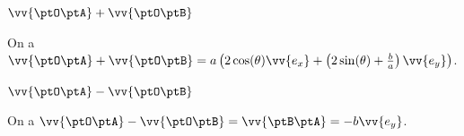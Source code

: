 
\begin{enonce}
 $\vv{\ptO \ptA} + \vv{\ptO \ptB}$
\end{enonce}


\begin{corrige}
	On a $\vv{\ptO \ptA}+ \vv{\ptO \ptB} = a \left(2\cos(\theta) \vv{e_x}+\left(2\sin(\theta)+\frac{b}{a}\right)\vv{e_y}\right)$.
\end{corrige}





\begin{enonce}
  $\vv{\ptO \ptA}-\vv{\ptO \ptB}$
\end{enonce}


\begin{corrige}
	On a $\vv{\ptO \ptA}-\vv{\ptO \ptB} =\vv{\ptB \ptA}=-b \vv{e_y}$.
\end{corrige}




\finEntrainement







\hauteurLargeurCadreReponse		{8mm}{4cm}
\initialisationEntrainement


